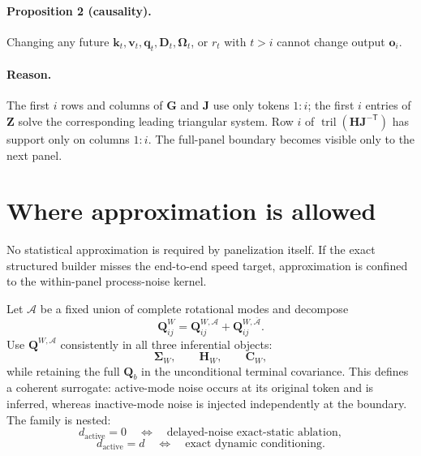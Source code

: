 \documentclass[11pt]{article}
\newcommand{\ve}[1]{\boldsymbol{#1}}
\newcommand{\tr}{\mathsf{T}}
\DeclareMathOperator{\tril}{tril}
\begin{document}
\paragraph{Proposition 2 (causality).}
Changing any future $\ve{k}_t,\ve{v}_t,\ve{q}_t,\ve{D}_t,\ve{\Omega}_t$, or $r_t$ with $t>i$
cannot change output $\ve{o}_i$.

\paragraph{Reason.}
The first $i$ rows and columns of $\ve{G}$ and $\ve{J}$ use only tokens $1{:}i$; the first $i$
entries of $\ve{Z}$ solve the corresponding leading triangular system.  Row $i$ of
$\tril(\ve{H}\ve{J}^{-\tr})$ has support only on columns $1{:}i$.  The full-panel boundary becomes
visible only to the next panel.

\section{Where approximation is allowed}

No statistical approximation is required by panelization itself.  If the exact structured
builder misses the end-to-end speed target, approximation is confined to the within-panel
process-noise kernel.

Let $\mathcal A$ be a fixed union of complete rotational modes and decompose
\begin{equation}
  \ve{Q}_{ij}^{W}
  =\ve{Q}_{ij}^{W,\mathcal A}
   +\ve{Q}_{ij}^{W,\overline{\mathcal A}}.
\end{equation}
Use $\ve{Q}^{W,\mathcal A}$ consistently in all three inferential objects:
\begin{equation}
  \ve{\Sigma}_W,
  \qquad
  \ve{H}_W,
  \qquad
  \ve{C}_W,
  \label{eq:matched-approximation}
\end{equation}
while retaining the full $\ve{Q}_b$ in the unconditional terminal covariance.  This defines a
coherent surrogate: active-mode noise occurs at its original token and is inferred, whereas
inactive-mode noise is injected independently at the boundary.  The family is nested:
\begin{equation}
  d_{\mathrm{active}}=0
  \quad\Longleftrightarrow\quad
  \text{delayed-noise exact-static ablation},
\end{equation}
\begin{equation}
  d_{\mathrm{active}}=d
  \quad\Longleftrightarrow\quad
  \text{exact dynamic conditioning}.
\end{equation}
\end{document}
